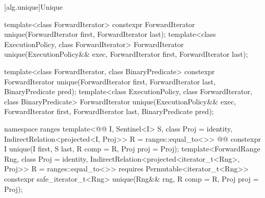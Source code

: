 [alg.unique]{Unique}

%
\begin{itemdecl}
template<class ForwardIterator>
  constexpr ForwardIterator unique(ForwardIterator first, ForwardIterator last);
template<class ExecutionPolicy, class ForwardIterator>
  ForwardIterator unique(ExecutionPolicy&& exec,
                         ForwardIterator first, ForwardIterator last);

template<class ForwardIterator, class BinaryPredicate>
  constexpr ForwardIterator unique(ForwardIterator first, ForwardIterator last,
                                   BinaryPredicate pred);
template<class ExecutionPolicy, class ForwardIterator, class BinaryPredicate>
  ForwardIterator unique(ExecutionPolicy&& exec,
                         ForwardIterator first, ForwardIterator last,
                         BinaryPredicate pred);
\end{itemdecl}
\begin{addedblock}
\begin{itemdecl}
namespace ranges {
  template<@@ I, Sentinel<I> S, class Proj = identity,
      IndirectRelation<projected<I, Proj>> R = ranges::equal_to<>>
    @@
    constexpr I unique(I first, S last, R comp = R{}, Proj proj = Proj{});
  template<ForwardRange Rng, class Proj = identity,
      IndirectRelation<projected<iterator_t<Rng>, Proj>> R = ranges::equal_to<>>
    requires Permutable<iterator_t<Rng>>
    constexpr safe_iterator_t<Rng>
      unique(Rng&& rng, R comp = R{}, Proj proj = Proj{});
}
\end{itemdecl}
\end{addedblock}

